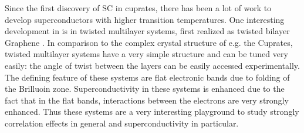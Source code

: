 \documentclass[../notes.tex]{subfiles}
\begin{document}
Since the first discovery of SC in cuprates, there has been a lot of work to develop superconductors with higher transition temperatures.
One interesting development in is in twisted multilayer systems, first realized as twisted bilayer Graphene \cite{caoUnconventionalSuperconductivityMagicangle2018}.
In comparison to the complex crystal structure of e.g. the Cuprates, twisted multilayer systems have a very simple structure and can be tuned very easily: the angle of twist between the layers can be easily accessed experimentally.
The defining feature of these systems are flat electronic bands due to folding of the Brilluoin zone.
Superconductivity in these systems is enhanced due to the fact that in the flat bands, interactions between the electrons are very strongly enhanced.
Thus these systems are a very interesting playground to study strongly correlation effects in general and superconductivity in particular.
	

\end{document}
